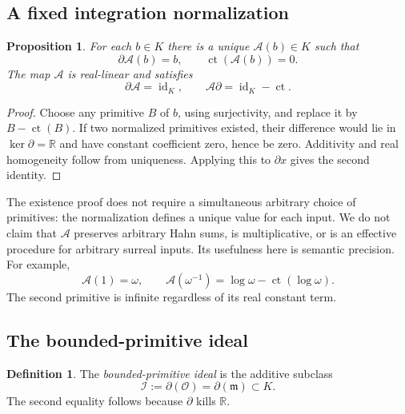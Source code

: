 \documentclass[11pt]{article}
\numberwithin{equation}{section}
\newtheorem{proposition}[theorem]{Proposition}
\theoremstyle{definition}
\newtheorem{definition}[theorem]{Definition}
\newcommand{\R}{\mathbb R}
\newcommand{\OO}{\mathcal O}
\newcommand{\mm}{\mathfrak m}
\newcommand{\II}{\mathcal I}
\newcommand{\DD}{\partial}
\newcommand{\Prim}{\mathcal A}
\newcommand{\ct}{\operatorname{ct}}
\newcommand{\id}{\operatorname{id}}
\begin{document}
\subsection{A fixed integration normalization}
\begin{proposition}\label{prop:A}
For each $b\in K$ there is a unique $\Prim(b)\in K$ such that
\[
 \DD\Prim(b)=b,\qquad \ct(\Prim(b))=0.
\]
The map $\Prim$ is real-linear and satisfies
\begin{equation}\label{eq:Aidentities}
 \DD\Prim=\id_K,\qquad \Prim\DD=\id_K-\ct.
\end{equation}
\end{proposition}
\begin{proof}
Choose any primitive $B$ of $b$, using surjectivity, and replace it by
$B-\ct(B)$. If two normalized primitives existed, their difference would
lie in $\ker\DD=\R$ and have constant coefficient zero, hence be zero.
Additivity and real homogeneity follow from uniqueness. Applying this to
$\DD x$ gives the second identity.
\end{proof}

The existence proof does not require a simultaneous arbitrary choice of
primitives: the normalization defines a unique value for each input.
We do not claim that $\Prim$ preserves arbitrary Hahn sums, is multiplicative,
or is an effective procedure for arbitrary surreal inputs. Its usefulness
here is semantic precision. For example,
\[
 \Prim(1)=\omega,\qquad
 \Prim(\omega^{-1})=\log\omega-\ct(\log\omega).
\]
The second primitive is infinite regardless of its real constant term.

\subsection{The bounded-primitive ideal}
\begin{definition}\label{def:I}
The \emph{bounded-primitive ideal} is the additive subclass
\[
 \II:=\DD(\OO)=\DD(\mm)\subset K.
\]
The second equality follows because $\DD$ kills $\R$.
\end{definition}
\end{document}
